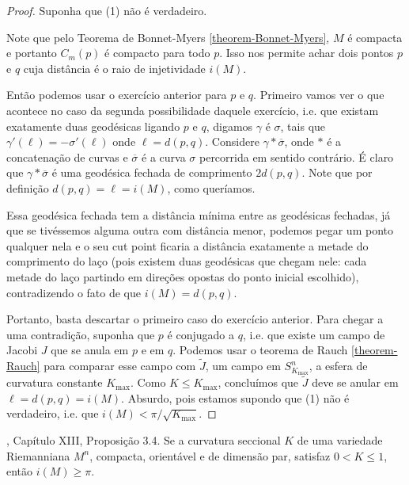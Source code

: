 \begin{proof}
Suponha que (1) não é verdadeiro. 

Note que pelo Teorema de Bonnet-Myers 
\ref{theorem-Bonnet-Myers}, $M$ é compacta e portanto $C_m(p)$ é compacto para
todo $p$. Isso nos permite achar dois pontos $p$ e $q$ cuja distância é o raio
de injetividade  $i(M)$.

Então podemos usar o exercício anterior para $p$ e $q$.  Primeiro vamos ver o
que acontece no caso da segunda possibilidade daquele exercício, i.e. que
existam exatamente duas geodésicas ligando $p$ e $q$, digamos $\gamma$ é
$\sigma$, tais que $\gamma'(\ell)=-\sigma'(\ell)$ onde $\ell=d(p,q)$.  Considere
$\gamma * \overline{\sigma}$, onde $*$ é a concatenação de curvas e 
$\overline{\sigma}$ é a curva $\sigma$ percorrida em sentido contrário. É claro
que $\gamma * \overline{\sigma}$ é uma geodésica fechada de comprimento $2
d(p,q)$. Note que por definição  $d(p,q)=\ell=i(M)$, como queríamos.

Essa geodésica fechada tem a distância mínima entre as geodésicas fechadas, já
que se tivéssemos alguma outra com distância menor, podemos pegar um ponto
qualquer nela e o seu cut point ficaria a distância exatamente a metade do
comprimento do laço (pois existem duas geodésicas que chegam nele: cada
metade do laço partindo em direções opostas do ponto inicial escolhido),
contradizendo o fato de que $i(M)=d(p,q)$.

Portanto, basta descartar o primeiro caso do exercício anterior. Para chegar a
 uma contradição, suponha que $p $ é conjugado a $q$, i.e. que existe um campo
 de Jacobi $J$ que se anula em $p$ e em $q$. Podemos usar o teorema de Rauch
\ref{theorem-Rauch} para comparar esse campo com $\tilde{J}$, 
um campo em $S^n_{K_{\text{max}}}$, a esfera de curvatura constante
 $K_{\text{max}}$. Como $K \leq  K_{\text{max}}$,
concluímos que $\tilde{J}$ deve se anular em $\ell=d(p,q)=i(M)$. Absurdo, pois
estamos supondo que (1) não é verdadeiro, i.e. que
 $i(M) < \pi/\sqrt{K_{\text{max}}}$.
\end{proof}

\begin{exercise}
\label{exercise-proposição-3.4}
\cite{doc}, Capítulo XIII, Proposição 3.4. Se a curvatura seccional $K$ de uma
variedade Riemanniana $M^n$, compacta, orientável e de dimensão par, satisfaz 
$0<K \leq 1$, então $i(M) \geq \pi$.
\end{exercise}


